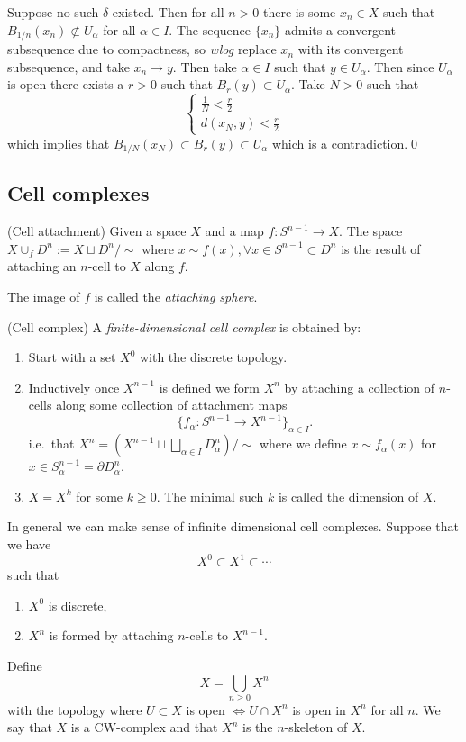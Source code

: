 \documentclass{article}
\begin{document}
  \pf Suppose no such $ \delta $ existed. Then for all $ n > 0 $ there is some $ x_n\in X $ such that $ B_{1/n}(x_n)\not\subset U_\alpha $ for all $ \alpha\in I $. The sequence $ \{x_n\} $ admits a convergent subsequence due to compactness, so \textit{wlog} replace $ x_n $ with its convergent subsequence, and take $ x_n\to y $. Then take $ \alpha\in I $ such that $ y\in U_\alpha $. Then since $ U_\alpha $ is open there exists a $ r>0 $ such that $ B_r(y)\subset U_\alpha $. Take $ N>0 $ such that
\[
  \begin{cases}
    \frac 1N < \frac r2 \\
    d(x_N,y) < \frac r2
  \end{cases}
\]
which implies that $ B_{1/N}(x_N)\subset B_r(y)\subset U_\alpha $ which is a contradiction.\qed
\subsection{Cell complexes}
\begin{definition}
	(Cell attachment) Given a space $ X $ and a map $ f:S^{n-1} \to X $. The space $ X\cup_f D^n := X \sqcup D^n / \sim $ where $ x\sim f(x), \forall x \in S^{n-1}\subset D^n $ is the result of attaching an $ n $-cell to $ X $ along $ f $.
	\par
	The image of $ f $ is called the \textit{attaching sphere}.
\end{definition}
\begin{definition}
	(Cell complex) A \textit{finite-dimensional cell complex} is obtained by:
	\begin{enumerate}
		\item Start with a set $ X^0 $ with the discrete topology.
		\item Inductively once $ X^{n-1} $ is defined we form $ X^n $ by attaching a collection of $ n $-cells along some collection of attachment maps
			\[
				\{ f_\alpha:S^{n-1} \to X^{n-1}\}_{\alpha\in I}.
			\]
		i.e.\ that $ X^n = \left( X^{n-1} \sqcup \bigsqcup_{\alpha\in I} D_\alpha^n\right) / \sim $ where we define $ x\sim f_\alpha(x) $ for $ x\in S^{n-1}_\alpha = \partial D^n_\alpha $.
	\item $ X=X^k $ for some $ k\ge 0 $. The minimal such $ k $ is called the dimension of $ X $.
	\end{enumerate}
\end{definition}
\begin{remark}
  In general we can make sense of infinite dimensional cell complexes. Suppose that we have
  \[
    X^0 \subset X^1 \subset \cdots
  \]
  such that
  \begin{enumerate}
	  \item $ X^0 $ is discrete,
	  \item $ X^n $ is formed by attaching $ n $-cells to $ X^{n-1} $.
  \end{enumerate}
  Define
  \[
	  X = \bigcup_{n\ge 0} X^n
  \]
  with the topology where $ U \subset X $ is open $ \iff U \cap X^n $ is open in $ X^n $ for all $ n $. We say that $ X $ is a CW-complex and that $ X^n $ is the $ n $-skeleton of $ X $.
 \end{remark}
\end{document}
